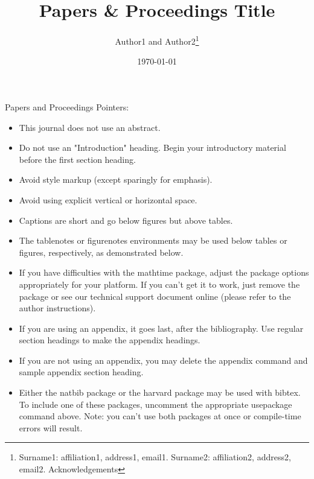\documentclass[PP,
finalmode,  %
]{AEA}
\begin{document}
\title{Papers \& Proceedings Title}
\author{Author1 and Author2\thanks{Surname1: affiliation1, address1, email1.
        Surname2: affiliation2, address2, email2. Acknowledgements}}
\date{\today}
\maketitle

Papers and Proceedings Pointers:

\begin{itemize}

    \item This journal does not use an abstract.
          
    \item Do not use an "Introduction" heading. Begin your introductory material
          before the first section heading.
          
    \item Avoid style markup (except sparingly for emphasis).
          
    \item Avoid using explicit vertical or horizontal space.
          
    \item Captions are short and go below figures but above tables.
          
    \item The tablenotes or figurenotes environments may be used below tables
          or figures, respectively, as demonstrated below.
          
    \item If you have difficulties with the mathtime package, adjust the package
          options appropriately for your platform. If you can't get it to work, just
          remove the package or see our technical support document online (please
          refer to the author instructions).
          
    \item If you are using an appendix, it goes last, after the bibliography.
          Use regular section headings to make the appendix headings.
          
    \item If you are not using an appendix, you may delete the appendix command
          and sample appendix section heading.
          
    \item Either the natbib package or the harvard package may be used with bibtex.
          To include one of these packages, uncomment the appropriate usepackage command
          above. Note: you can't use both packages at once or compile-time errors will result.
          
\end{itemize}
\end{document}
